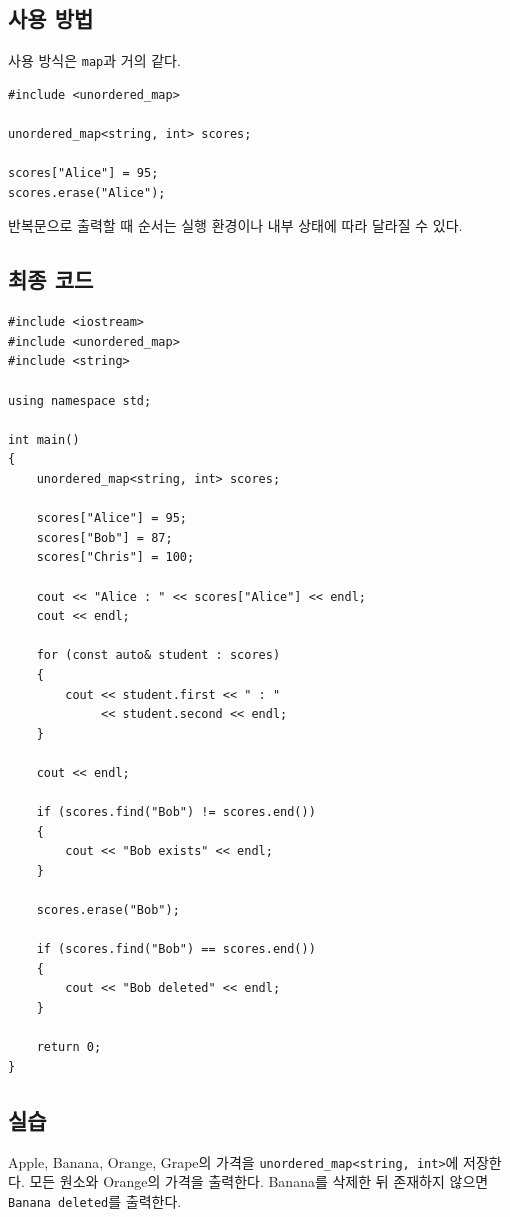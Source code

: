\documentclass[11pt,a4paper]{article}
\begin{document}
\subsection{사용 방법}
사용 방식은 \texttt{map}과 거의 같다.

\begin{lstlisting}
#include <unordered_map>

unordered_map<string, int> scores;

scores["Alice"] = 95;
scores.erase("Alice");
\end{lstlisting}

반복문으로 출력할 때 순서는 실행 환경이나 내부 상태에 따라 달라질 수 있다.

\subsection{최종 코드}
\begin{lstlisting}
#include <iostream>
#include <unordered_map>
#include <string>

using namespace std;

int main()
{
    unordered_map<string, int> scores;

    scores["Alice"] = 95;
    scores["Bob"] = 87;
    scores["Chris"] = 100;

    cout << "Alice : " << scores["Alice"] << endl;
    cout << endl;

    for (const auto& student : scores)
    {
        cout << student.first << " : "
             << student.second << endl;
    }

    cout << endl;

    if (scores.find("Bob") != scores.end())
    {
        cout << "Bob exists" << endl;
    }

    scores.erase("Bob");

    if (scores.find("Bob") == scores.end())
    {
        cout << "Bob deleted" << endl;
    }

    return 0;
}
\end{lstlisting}

\subsection{실습}
\begin{practicebox}
Apple, Banana, Orange, Grape의 가격을 \texttt{unordered\_map<string, int>}에 저장한다. 모든 원소와 Orange의 가격을 출력한다. Banana를 삭제한 뒤 존재하지 않으면 \texttt{Banana deleted}를 출력한다.
\end{practicebox}
\end{document}
